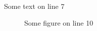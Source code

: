 \documentclass{testing}
\begin{document}
Some text on line 7

\begin{figure}
Some figure on line 10
\end{figure}




\end{document}
